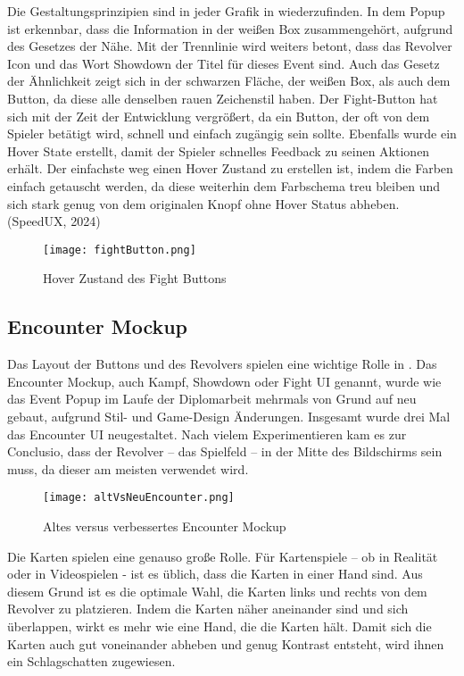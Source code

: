 Die Gestaltungsprinzipien sind in jeder Grafik in \FF wiederzufinden. In dem Popup ist erkennbar, dass die Information in der weißen Box zusammengehört, aufgrund des Gesetzes der Nähe. Mit der Trennlinie wird weiters betont, dass das Revolver Icon und das Wort Showdown der Titel für dieses Event sind. Auch das Gesetz der Ähnlichkeit zeigt sich in der schwarzen Fläche, der weißen Box, als auch dem Button, da diese alle denselben rauen Zeichenstil haben. Der Fight-Button hat sich mit der Zeit der Entwicklung vergrößert, da ein Button, der oft von dem Spieler betätigt wird, schnell und einfach zugängig sein sollte. Ebenfalls wurde ein Hover State erstellt, damit der Spieler schnelles Feedback zu seinen Aktionen erhält. Der einfachste weg einen Hover Zustand zu erstellen ist, indem die Farben einfach getauscht werden, da diese weiterhin dem Farbschema treu bleiben und sich stark genug von dem originalen Knopf ohne Hover Status abheben. (SpeedUX, 2024)

\begin{figure}[H]
    \centering
    \texttt{[image: fightButton.png]}
    \caption{Hover Zustand des Fight Buttons}
\end{figure}

\subsection{Encounter Mockup}

Das Layout der Buttons und des Revolvers spielen eine wichtige Rolle in \FF. Das Encounter Mockup, auch Kampf, Showdown oder Fight UI genannt, wurde wie das Event Popup im Laufe der Diplomarbeit mehrmals von Grund auf neu gebaut, aufgrund Stil- und Game-Design Änderungen. Insgesamt wurde drei Mal das Encounter UI neugestaltet. Nach vielem Experimentieren kam es zur Conclusio, dass der Revolver – das Spielfeld – in der Mitte des Bildschirms sein muss, da dieser am meisten verwendet wird.

\begin{figure}[H]
    \centering
    \texttt{[image: altVsNeuEncounter.png]}
    \caption{Altes versus verbessertes Encounter Mockup}
\end{figure}

Die Karten spielen eine genauso große Rolle. Für Kartenspiele – ob in Realität oder in Videospielen - ist es üblich, dass die Karten in einer Hand sind. Aus diesem Grund ist es die optimale Wahl, die Karten links und rechts von dem Revolver zu platzieren. Indem die Karten näher aneinander sind und sich überlappen, wirkt es mehr wie eine Hand, die die Karten hält. Damit sich die Karten auch gut voneinander abheben und genug Kontrast entsteht, wird ihnen ein Schlagschatten zugewiesen.


